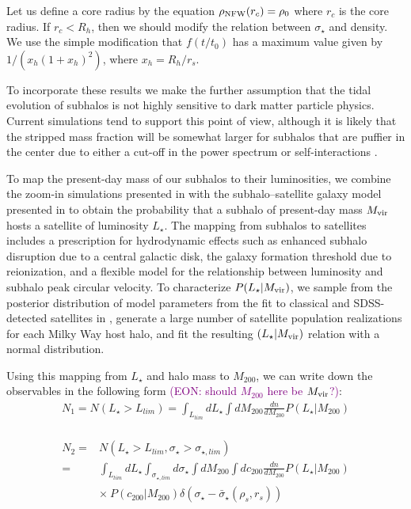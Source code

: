 \documentclass[modern,linenumbers]{aastex62}
\newcommand{\Comment}[3]{\textcolor{#1}{(#2: #3)}}
\newcommand{\EON}[1]{\Comment{purple}{EON}{#1}} %
\begin{document}
Let us define a core radius by the equation $\rho_{\rm NFW}(r_c) = \rho_0$ where $r_c$ is the core radius. If $r_c < R_h$, then we should modify the relation between $\sigma_\star$ and density. We use the simple modification that $f(t/t_0)$ has a maximum value given by $1/(x_h(1+x_h)^2)$, where $x_h = R_h/r_s$. 

To incorporate these results we make the further assumption that the tidal evolution of subhalos is not highly sensitive to dark matter particle physics. Current simulations tend to support this point of view, although it is likely that the stripped mass fraction will be somewhat larger for subhalos that are puffier in the center due to either a cut-off in the power spectrum or self-interactions \citep{Lovell:2013ola, 1603.08919}. 

To map the present-day mass of our subhalos to their luminosities, we combine the zoom-in simulations presented in \cite{Mao2015} with the subhalo--satellite galaxy model presented in \cite{Nadler:2018} to obtain the probability that a subhalo of present-day mass $M_{\rm{vir}}$ hosts a satellite of luminosity $L_\star$. The mapping from subhalos to satellites includes a prescription for hydrodynamic effects such as enhanced subhalo disruption due to a central galactic disk, the galaxy formation threshold due to reionization, and a flexible model for the relationship between luminosity and subhalo peak circular velocity. To characterize $P(L_\star|M_{\rm{vir}})$, we sample from the posterior distribution of model parameters from the fit to classical and SDSS-detected satellites in \cite{Nadler:2018}, generate a large number of satellite population realizations for each Milky Way host halo, and fit the resulting $(L_\star|M_{\rm{vir}})$ relation with a normal distribution.

Using this mapping from $L_\star$ and halo mass to $M_{200}$, we can write down the observables in the following form \EON{should $M_{200}$ here be $M_{\rm{vir}}$?}:
\begin{equation}
    \begin{aligned}
    N_1 = N(L_\star>L_{lim})= \int_{L_{lim}} dL_\star \int dM_{200} \frac{dn}{d M_{200}} P(L_\star|M_{200}) \\
    \end{aligned}
\end{equation}

\begin{equation}
    \begin{aligned}
N_2 =& N(L_\star>L_{lim}, \sigma_\star> \sigma_{\star,lim}) \\ 
    =& \int_{L_{lim}} dL_\star \int_{\sigma_{\star,lim}} d\sigma_\star \int dM_{200} \int dc_{200} \frac{dn}{d M_{200}} P(L_\star|M_{200})\\
    & \times\ P(c_{200}|M_{200}) \delta(\sigma_\star-\bar{\sigma}_\star(\rho_s,r_s))
    \end{aligned}
\end{equation}
\end{document}
